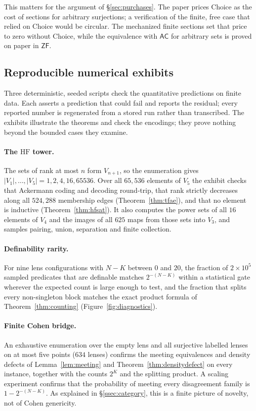 \documentclass[11pt]{article}
\newcommand{\HF}{\mathrm{HF}}                 \newcommand{\rank}{\operatorname{rank}}
\theoremstyle{definition}
\begin{document}
This matters for the argument of \S\ref{sec:purchases}. The paper prices Choice as the cost of
sections for arbitrary surjections; a verification of the finite, free case that relied on Choice
would be circular. The mechanized finite sections set that price to zero without Choice, while the
equivalence with $\mathsf{AC}$ for arbitrary sets is proved on paper in $\mathsf{ZF}$.

\subsection{Reproducible numerical exhibits}

Three deterministic, seeded scripts check the quantitative predictions on finite data. Each
asserts a prediction that could fail and reports the residual; every reported number is
regenerated from a stored run rather than transcribed. The exhibits illustrate the theorems and
check the encodings; they prove nothing beyond the bounded cases they examine.

\paragraph{The $\HF$ tower.} The sets of rank at most $n$ form $V_{n+1}$, so the enumeration gives
$|V_1|,\dots,|V_5|=1,2,4,16,65536$. Over all $65{,}536$ elements of $V_5$ the exhibit checks
that Ackermann coding and decoding round-trip, that rank strictly decreases along all
$524{,}288$ membership edges (Theorem~\ref{thm:tfae}), and that no element is inductive
(Theorem~\ref{thm:hfsat}). It also computes the power sets of all $16$ elements of $V_4$ and the
images of all $625$ maps from those sets into $V_3$, and samples pairing, union, separation and
finite collection.

\paragraph{Definability rarity.} For nine lens configurations with $N-K$ between $0$ and $20$, the
fraction of $2\times10^5$ sampled predicates that are definable matches $2^{-(N-K)}$ within a
statistical gate wherever the expected count is large enough to test, and the fraction that
splits every non-singleton block matches the exact product formula of Theorem~\ref{thm:counting}
(Figure~\ref{fig:diagnostics}).

\paragraph{Finite Cohen bridge.} An exhaustive enumeration over the empty lens and all
surjective labelled lenses on at most five points ($634$ lenses) confirms the meeting equivalences
and density defects of Lemma~\ref{lem:meeting} and Theorem~\ref{thm:densitydefect} on every
instance, together with the counts $2^K$ and the splitting product. A scaling experiment confirms
that the probability of meeting every disagreement family is $1-2^{-(N-K)}$. As explained in
\S\ref{ssec:category}, this is a finite picture of novelty, not of Cohen genericity.
\end{document}
